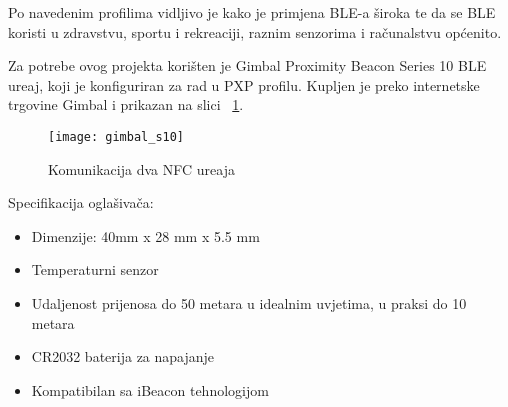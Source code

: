 Po navedenim profilima vidljivo je kako je primjena BLE-a \v{s}iroka te da se BLE koristi u zdravstvu, sportu i rekreaciji, raznim senzorima i ra\v{c}unalstvu op\'{c}enito.

Za potrebe ovog projekta kori\v{s}ten je Gimbal Proximity Beacon Series 10 BLE ure\dj aj, koji je konfiguriran za rad u PXP profilu. Kupljen je preko internetske trgovine Gimbal \cite{gimbal_beacon} i prikazan na slici ~\ref{fig:gimbal_oglasivac}.

\begin{figure}[!htbp]
	\begin{center}
 \texttt{[image: gimbal\_s10]}
 \caption{Komunikacija dva NFC ure\dj aja}
 \label{fig:gimbal_oglasivac}
	\end{center}
\end{figure}

Specifikacija ogla\v{s}iva\v{c}a:


\begin{itemize}
	\item Dimenzije: 40mm x 28 mm x 5.5 mm
	\item Temperaturni senzor
	\item Udaljenost prijenosa do 50 metara u idealnim uvjetima, u praksi do 10 metara
	\item CR2032 baterija za napajanje
	\item Kompatibilan sa iBeacon tehnologijom

\end{itemize}

